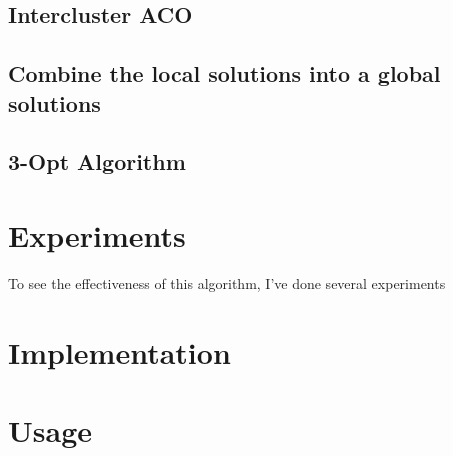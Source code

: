 \documentclass[a4paper]{article}
\begin{document}
\subsection{Intercluster ACO}


\subsection{Combine the local solutions into a global solutions}



\subsection{3-Opt Algorithm}




\section{Experiments}
To see the effectiveness of this algorithm, I've done several experiments 



\section{Implementation}


\section{Usage}



\newpage

{}
\end{document}
